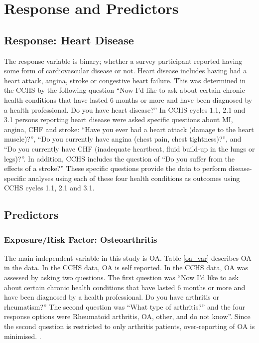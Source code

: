 \section{Response and Predictors}
\subsection{Response: Heart Disease}
 The response variable is binary; whether a survey participant reported having some form of cardiovascular disease or not. Heart disease includes having had a heart attack, angina, stroke or congestive heart failure. This was determined in the CCHS by the following
question “Now I’d like to ask about certain chronic
health conditions that have lasted 6 months or more
and have been diagnosed by a health professional. Do
you have heart disease?” In CCHS cycles 1.1, 2.1 and 3.1
persons reporting heart disease were asked specific questions about MI, angina, CHF and stroke: “Have you ever
had a heart attack (damage to the heart muscle)?”, “Do
you currently have angina (chest pain, chest tightness)?”,
and “Do you currently have CHF (inadequate heartbeat,
fluid build-up in the lungs or legs)?”. In addition, CCHS
includes the question of “Do you suffer from the effects
of a stroke?” These specific questions provide the data to
perform disease-specific analyses using each of these
four health conditions as outcomes using CCHS cycles
1.1, 2.1 and 3.1. \cite{rahman2013relationship}


\subsection{Predictors}
\subsubsection{Exposure/Risk Factor: Osteoarthritis}
The main independent variable in this study is OA. Table \ref{oa_var} describes OA in the data. In the CCHS
data, OA is self reported. In the CCHS
data, OA was assessed by asking two questions. The first
question was “Now I’d like to ask about certain chronic
health conditions that have lasted 6 months or more
and have been diagnosed by a health professional. Do
you have arthritis or rheumatism?” The second question
was “What type of arthritis?” and the four response
options were Rheumatoid arthritis, OA, other, and do
not know”. Since the second question is restricted to
only arthritis patients, over-reporting of OA is minimised. \cite{rahman2013relationship}.


